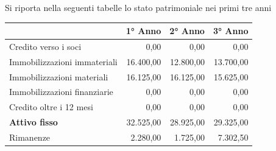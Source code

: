 \documentclass[12pt, a4paper]{article}
\begin{document}
\newpage\noindent
Si riporta nella seguenti tabelle lo stato patrimoniale nei primi tre anni
\begin{center}
    \begin{tabular}{|l|r|r|r|}
        \hline
        \rowcolor[HTML]{CBCEFB}
        \multicolumn{1}{|c|}{\cellcolor[HTML]{CBCEFB}\textbf{ATTIVO}} & \multicolumn{1}{c|}{\cellcolor[HTML]{CBCEFB}\textbf{1° Anno}} & \multicolumn{1}{c|}{\cellcolor[HTML]{CBCEFB}\textbf{2° Anno}} & \multicolumn{1}{c|}{\cellcolor[HTML]{CBCEFB}\textbf{3° Anno}} \\ \hline
        Credito verso i soci                                          & 0,00                                                          & 0,00                                                          & 0,00                                                          \\ \hline
        Immobilizzazioni immateriali                                  & 16.400,00                                                     & 12.800,00                                                     & 13.700,00                                                     \\ \hline
        Immobilizzazioni materiali                                    & 16.125,00                                                     & 16.125,00                                                     & 15.625,00                                                     \\ \hline
        Immobilizzazioni finanziarie                                  & 0,00                                                          & 0,00                                                          & 0,00                                                          \\ \hline
        Credito oltre i 12 mesi                                       & 0,00                                                          & 0,00                                                          & 0,00                                                          \\ \hline
        \rowcolor[HTML]{EFEFEF}
        \textbf{Attivo fisso}                                         & 32.525,00                                                     & 28.925,00                                                     & 29.325,00                                                     \\ \hline
        Rimanenze                                                     & 2.280,00                                                      & 1.725,00                                                      & 7.302,50                                                      \\ \hline

\end{tabular}
\end{center}
\end{document}

